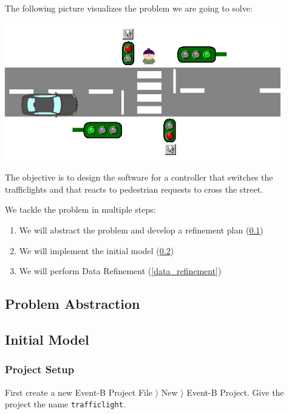 The following picture visualizes the problem we are going to solve:

\begin{center}
	\includegraphics[width=0.9\textwidth]{img/tutorial/trafficlight.png}
\end{center}

The objective is to design the software for a controller that switches the trafficlights and that reacts to pedestrian requests to cross the street.

We tackle the problem in multiple steps:

\begin{enumerate}
	\item We will abstract the problem and develop a refinement plan (\ref{tutorial_tl_problem_abstraction})
	\item We will implement the initial model (\ref{tutorial_tl_initial_model})
	\item We will perform Data Refinement (\ref{data_refinement})
\end{enumerate}

\subsection{Problem Abstraction}
\label{tutorial_tl_problem_abstraction}

\subsection{Initial Model}
\label{tutorial_tl_initial_model}

\subsubsection{Project Setup}

First create a new Event-B Project \textsf{File $\rangle$ New $\rangle$ Event-B Project}.  Give the project the name \texttt{trafficlight}.

